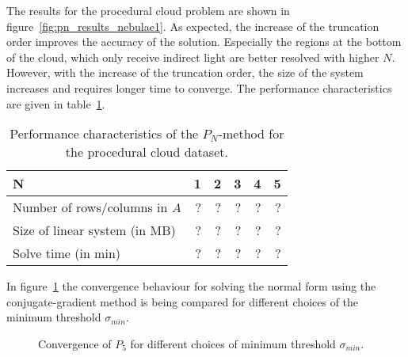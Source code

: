 The results for the procedural cloud problem are shown in figure~\ref{fig:pn_results_nebulae1}. As expected, the increase of the truncation order improves the accuracy of the solution. Especially the regions at the bottom of the cloud, which only receive indirect light are better resolved with higher $N$. However, with the increase of the truncation order, the size of the system increases and requires longer time to converge. The performance characteristics are given in table~\ref{tab:results_cloud}.
\begin{table}[!h]
	\centering
	\caption[TODO]{Performance characteristics of the $P_N$-method for the procedural cloud dataset.}
	\label{tab:results_cloud}
	\begin{tabular}{l r r r r r}
    \hline
	\textbf{N}
    & 1 & 2 & 3 & 4 & 5
    \\
    \hline
    Number of rows/columns in $A$
    & ? & ? & ? & ? & ?
    \\
    Size of linear system (in MB)
    & ? & ? & ? & ? & ?
    \\
    Solve time (in min)
    & ? & ? & ? & ? & ?
	\end{tabular}
\end{table}

In figure~\ref{fig:pn_results_convergence} the convergence behaviour for solving the normal form using the conjugate-gradient method is being compared for different choices of the minimum threshold $\sigma_{min}$.
\begin{figure}[h]
\centering
{}
\caption{Convergence of $P_5$ for different choices of minimum threshold $\sigma_{min}$.}
\label{fig:pn_results_convergence}
\end{figure}




